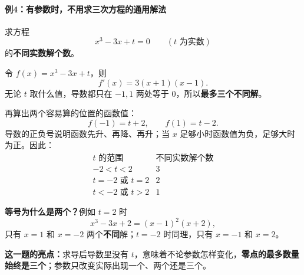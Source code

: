 \begin{examplebox}
\par\medskip
\noindent\begin{minipage}{\linewidth}
\paragraph{例4：有参数时，不用求三次方程的通用解法}
\begin{center}\end{center}
\end{minipage}\par\medskip

求方程
\[
x^3-3x+t=0\qquad (t\text{ 为实数})
\]
的\textbf{不同实数解个数}。

令 $f(x)=x^3-3x+t$，则
\[
f'(x)=3(x+1)(x-1).
\]
无论 $t$ 取什么值，导数都只在 $-1,1$ 两处等于 $0$，所以\textbf{最多三个不同解}。

再算出两个容易算的位置的函数值：
\[
f(-1)=t+2,\qquad f(1)=t-2.
\]
导数的正负号说明函数先升、再降、再升；当 $x$ 足够小时函数值为负，足够大时为正。因此：
\[
\boxed{
\begin{array}{c|c}
t\text{ 的范围}&\text{不同实数解个数}\\ \hline
-2<t<2&3\\
t=-2\text{ 或 }t=2&2\\
t<-2\text{ 或 }t>2&1
\end{array}}
\]
\begin{center}\end{center}

\textbf{等号为什么是两个？}例如 $t=2$ 时
\[
x^3-3x+2=(x-1)^2(x+2),
\]
只有 $x=1$ 和 $x=-2$ 两个\textbf{不同}解；$t=-2$ 时同理，只有 $x=-1$ 和 $x=2$。

\textbf{这一题的亮点：}求导后导数里没有 $t$，意味着不论参数怎样变化，\textbf{零点的最多数量始终是三个}；参数只改变实际出现一个、两个还是三个。
\end{examplebox}
\clearpage
